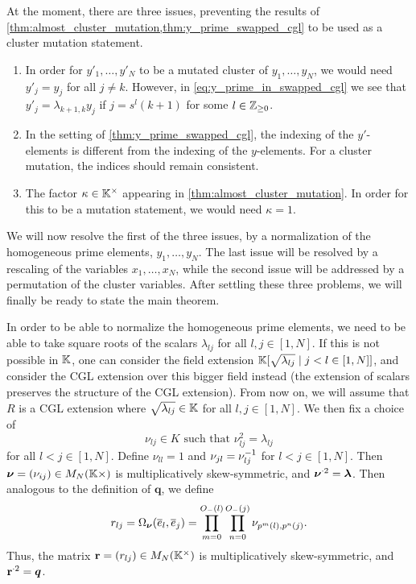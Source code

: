 At the moment, there are three issues, preventing the results of
\cref{thm:almost_cluster_mutation,thm:y_prime_swapped_cgl} to be used as a cluster
mutation statement.

\begin{enumerate}
	\item In order for $y'_1, \dots, y'_N$ to be a mutated cluster of $y_1, \dots, y_N$, we would
	      need $y'_j = y_j$ for all $j \neq k$. However, in \cref{eq:y_prime_in_swapped_cgl} we
	      see that $y'_j = \lambda_{k+1,k}y_j$ if $j = s^l(k+1)$ for some $l \in \mathbb{Z}_{\geq 0}$.
	\item In the setting of \cref{thm:y_prime_swapped_cgl}, the indexing of the $y'$-elements is
	      different from the indexing of the $y$-elements. For a cluster mutation, the indices
	      should remain consistent.
	\item The factor $\kappa \in \mathbb{K}^\times$ appearing in \cref{thm:almost_cluster_mutation}. In
	      order for this to be a mutation statement, we would need $\kappa = 1$.
\end{enumerate}

We will now resolve the first of the three issues, by a normalization of the
homogeneous prime elements, $y_1, \dots, y_N$. The last issue will be resolved by a
rescaling of the variables $x_1, \dots, x_N$, while the second issue will be addressed
by a permutation of the cluster variables. After settling these three problems, we will
finally be ready to state the main theorem.

In order to be able to normalize the homogeneous prime elements, we need to be able to
take square roots of the scalars $\lambda_{lj}$ for all $l,j \in [1, N]$. If this is
not possible in $\mathbb{K}$, one can consider the field extension $\mathbb{K}[\sqrt{\lambda_{lj}}
		\mid j < l \in [1, N]]$, and consider the CGL extension over this bigger field instead
(the extension of scalars preserves the structure of the CGL extension). From now on,
we will assume that $R$ is a CGL extension where $\sqrt{\lambda_{lj}} \in \mathbb{K}$ for all
$l, j \in [1, N]$. We then fix a choice of
\begin{equation*}
	\nu_{lj} \in K \text{ such that } \nu^2_{lj} = \lambda_{lj}
\end{equation*}
%
for all $l < j \in [1, N]$. Define $\nu_{ll} = 1$ and $\nu_{jl} = \nu_{lj}^{-1}$ for $l
	< j \in [1, N]$. Then $\boldsymbol{\nu} = (\nu_{ij}) \in M_N(\mathbb{K}\times)$ is multiplicatively
skew-symmetric, and $\boldsymbol{\nu}^{\cdot 2} = \boldsymbol{\lambda}$. Then analogous to the
definition of $\mathbf{q}$, we define
\begin{equation*}
	r_{lj} = \Omega_{\boldsymbol{\nu}}(\overline{e}_l, \overline{e}_j) = \prod_{m=0}^{O_{-}(l)}\prod_{n=0}^{O_{-}(j)}\nu_{p^m(l), p^n(j)}.
\end{equation*}
%
Thus, the matrix $\mathbf{r} = (r_{lj}) \in M_N(\mathbb{K}^\times)$ is multiplicatively
skew-symmetric, and $\mathbf{r}^{\cdot 2} = \boldsymbol{q}$.


